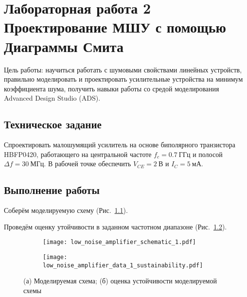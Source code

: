 \chapter{Лабораторная работа 2 \\
Проектирование МШУ с помощью Диаграммы Смита}

Цель работы: научиться работать с шумовыми свойствами линейных устройств, правильно моделировать и проектировать усилительные устройства на минимум коэффициента шума, получить навыки работы со средой моделирования Advanced Design Studio (ADS).

\section{Техническое задание}

Спроектировать малошумящий усилитель на основе биполярного транзистора HBFP0420, работающего на центральной частоте $f_c = 0.7~\text{ГГц}$ и полосой $\Delta f = 30~\text{МГц}$.
В рабочей точке обеспечить $V_{CE} = 2~\text{В}$ и $I_C = 5~\text{мА}$.

\section{Выполнение работы}

Соберём моделируемую схему (Рис.~\ref{fig:low_noise_amplifier_schematic_1}).

Проведём оценку утойчивости в заданном частотном диапазоне (Рис.~\ref{fig:low_noise_amplifier_data_1_sustainability}).

\begin{figure}[!ht]
    \centering
    \begin{subfigure}[b]{0.45\textwidth}
        \centering
        \texttt{[image: low\_noise\_amplifier\_schematic\_1.pdf]}
        \caption{}%
        \label{fig:low_noise_amplifier_schematic_1}
    \end{subfigure}
    \hfill
    \begin{subfigure}[b]{0.45\textwidth}
        \centering
        \texttt{[image: low\_noise\_amplifier\_data\_1\_sustainability.pdf]}
        \caption{}%
        \label{fig:low_noise_amplifier_data_1_sustainability}
    \end{subfigure}
        \caption{%
            (а) Моделируемая схема;
            (б) оценка устойчивости моделируемой схемы
        }%
        \label{fig:low_noise_amplifier_1}
\end{figure}

